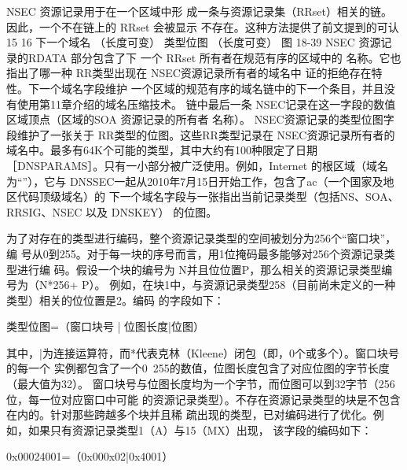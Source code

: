 NSEC 资源记录用于在一个区域中形
成一条与资源记录集（RRset）相关的链。
因此，一个不在链上的 RRset 会被显示
不存在。这种方法提供了前文提到的可认
15 16
下一个域名
（长度可变）
类型位图
（长度可变）
图 18-39
NSEC 资源记录的RDATA 部分包含了下
一个 RRset 所有者在规范有序的区域中的
名称。它也指出了哪一种 RR类型出现在
NSEC资源记录所有者的域名中
证的拒绝存在特性。下一个域名字段维护
一个区域的规范有序的域名链中的下一个条目，并且没有使用第11章介绍的域名压缩技术。
链中最后一条 NSEC记录在这一字段的数值区域顶点（区域的SOA 资源记录的所有者
名称）。
NSEC资源记录的类型位图字段维护了一张关于 RR类型的位图。这些RR类型记录在
NSEC资源记录所有者的域名中。最多有64K个可能的类型，其中大约有100种限定了日期
［DNSPARAMS］。只有一小部分被广泛使用。例如，Internet 的根区域（域名为“”），它与
DNSSEC一起从2010年7月15日开始工作，包含了ac（一个国家及地区代码顶级域名）的
下一个域名字段与一张指出当前记录类型（包括NS、SOA、RRSIG、NSEC 以及 DNSKEY）
的位图。

为了对存在的类型进行编码，整个资源记录类型的空间被划分为256个“窗口块”，编
号从0到255。对于每一块的序号而言，用1位掩码最多能够对256个资源记录类型进行编
码。假设一个块的编号为 N并且位位置P，那么相关的资源记录类型编号为（N*256+ P）。
例如，在块1中，与资源记录类型258（目前尚未定义的一种类型）相关的位位置是2。编码
的字段如下：

类型位图=（窗口块号 | 位图长度|位图）

其中，|为连接运算符，而*代表克林（Kleene）闭包（即，0个或多个）。窗口块号的每一个
实例都包含了一个0~255的数值，位图长度包含了对应位图的字节长度（最大值为32）。
窗口块号与位图长度均为一个字节，而位图可以到32字节（256位，每一位对应窗口中可能
的资源记录类型）。不存在资源记录类型的块是不包含在内的。针对那些跨越多个块并且稀
疏出现的类型，已对编码进行了优化。例如，如果只有资源记录类型1（A）与15（MX）出现，
该字段的编码如下：

0x00024001=（0x000x02|0x4001）

